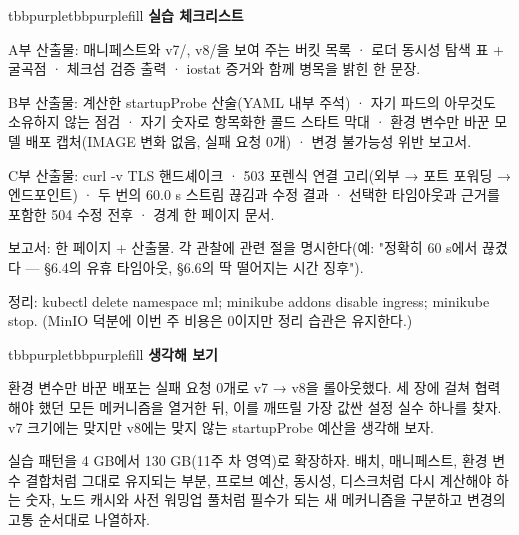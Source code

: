 \begin{calloutbox}{tbbpurple}{tbbpurplefill}
{\normalsize\bfseries\color{tbbpurple}실습 체크리스트}\par\vspace{3pt}
\begin{tbbitemize}
  \item A부 산출물: 매니페스트와 v7/, v8/을 보여 주는 버킷 목록 · 로더 동시성 탐색 표 + 굴곡점 · 체크섬 검증 출력 · iostat 증거와 함께 병목을 밝힌 한 문장.
  \item B부 산출물: 계산한 startupProbe 산술(YAML 내부 주석) · 자기 파드의 아무것도 소유하지 않는 점검 · 자기 숫자로 항목화한 콜드 스타트 막대 · 환경 변수만 바꾼 모델 배포 캡처(IMAGE 변화 없음, 실패 요청 0개) · 변경 불가능성 위반 보고서.
  \item C부 산출물: curl -v TLS 핸드셰이크 · 503 포렌식 연결 고리(외부 → 포트 포워딩 → 엔드포인트) · 두 번의 60.0 s 스트림 끊김과 수정 결과 · 선택한 타임아웃과 근거를 포함한 504 수정 전후 · 경계 한 페이지 문서.
  \item 보고서: 한 페이지 + 산출물. 각 관찰에 관련 절을 명시한다(예: "정확히 60 s에서 끊겼다 — §6.4의 유휴 타임아웃, §6.6의 딱 떨어지는 시간 징후").
  \item 정리: kubectl delete namespace ml; minikube addons disable ingress; minikube stop. (MinIO 덕분에 이번 주 비용은 0이지만 정리 습관은 유지한다.)
\end{tbbitemize}
\end{calloutbox}

\vspace{3.0pt}

\begin{calloutbox}{tbbpurple}{tbbpurplefill}
{\normalsize\bfseries\color{tbbpurple}생각해 보기}\par\vspace{3pt}
\begin{tbbitemize}
  \item 환경 변수만 바꾼 배포는 실패 요청 0개로 v7 → v8을 롤아웃했다. 세 장에 걸쳐 협력해야 했던 모든 메커니즘을 열거한 뒤, 이를 깨뜨릴 가장 값싼 설정 실수 하나를 찾자. v7 크기에는 맞지만 v8에는 맞지 않는 startupProbe 예산을 생각해 보자.
  \item 실습 패턴을 4 GB에서 130 GB(11주 차 영역)로 확장하자. 배치, 매니페스트, 환경 변수 결합처럼 그대로 유지되는 부분, 프로브 예산, 동시성, 디스크처럼 다시 계산해야 하는 숫자, 노드 캐시와 사전 워밍업 풀처럼 필수가 되는 새 메커니즘을 구분하고 변경의 고통 순서대로 나열하자.
\end{tbbitemize}
\end{calloutbox}

